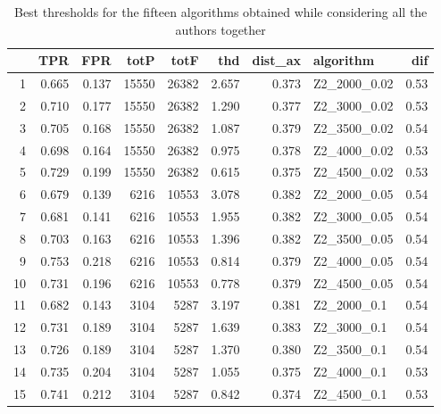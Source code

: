 \documentclass{article}\usepackage[]{graphicx}\usepackage[]{color}
\begin{document}
\begin{table}[ht]
\centering
\begin{tabular}{rrrrrrrlr}
  \hline
 & TPR & FPR & totP & totF & thd & dist\_ax & algorithm & dif \\ 
  \hline
1 & 0.665 & 0.137 & 15550 & 26382 & 2.657 & 0.373 & Z2\_2000\_0.02 & 0.53 \\ 
  2 & 0.710 & 0.177 & 15550 & 26382 & 1.290 & 0.377 & Z2\_3000\_0.02 & 0.53 \\ 
  3 & 0.705 & 0.168 & 15550 & 26382 & 1.087 & 0.379 & Z2\_3500\_0.02 & 0.54 \\ 
  4 & 0.698 & 0.164 & 15550 & 26382 & 0.975 & 0.378 & Z2\_4000\_0.02 & 0.53 \\ 
  5 & 0.729 & 0.199 & 15550 & 26382 & 0.615 & 0.375 & Z2\_4500\_0.02 & 0.53 \\ 
  6 & 0.679 & 0.139 & 6216 & 10553 & 3.078 & 0.382 & Z2\_2000\_0.05 & 0.54 \\ 
  7 & 0.681 & 0.141 & 6216 & 10553 & 1.955 & 0.382 & Z2\_3000\_0.05 & 0.54 \\ 
  8 & 0.703 & 0.163 & 6216 & 10553 & 1.396 & 0.382 & Z2\_3500\_0.05 & 0.54 \\ 
  9 & 0.753 & 0.218 & 6216 & 10553 & 0.814 & 0.379 & Z2\_4000\_0.05 & 0.54 \\ 
  10 & 0.731 & 0.196 & 6216 & 10553 & 0.778 & 0.379 & Z2\_4500\_0.05 & 0.54 \\ 
  11 & 0.682 & 0.143 & 3104 & 5287 & 3.197 & 0.381 & Z2\_2000\_0.1 & 0.54 \\ 
  12 & 0.731 & 0.189 & 3104 & 5287 & 1.639 & 0.383 & Z2\_3000\_0.1 & 0.54 \\ 
  13 & 0.726 & 0.189 & 3104 & 5287 & 1.370 & 0.380 & Z2\_3500\_0.1 & 0.54 \\ 
  14 & 0.735 & 0.204 & 3104 & 5287 & 1.055 & 0.375 & Z2\_4000\_0.1 & 0.53 \\ 
  15 & 0.741 & 0.212 & 3104 & 5287 & 0.842 & 0.374 & Z2\_4500\_0.1 & 0.53 \\ 
   \hline
\end{tabular}
\caption{Best thresholds for the fifteen algorithms obtained while considering all the authors together} 
\end{table}
\end{document}
